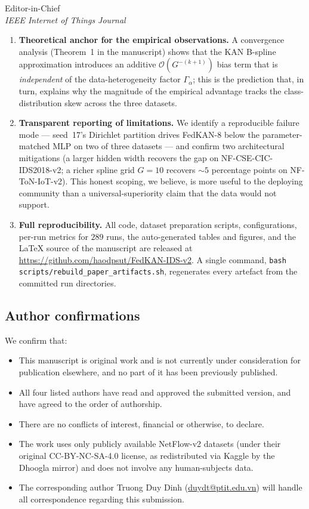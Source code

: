 \documentclass[11pt,a4paper]{letter}
\begin{document}
\begin{letter}{%
    Editor-in-Chief\\
    \emph{IEEE Internet of Things Journal}%
}
\begin{enumerate}
    \item \textbf{Theoretical anchor for the empirical observations.} A convergence analysis (Theorem~1 in the manuscript) shows that the KAN B-spline approximation introduces an additive $\mathcal{O}(G^{-(k+1)})$ bias term that is \emph{independent} of the data-heterogeneity factor $\Gamma_\alpha$; this is the prediction that, in turn, explains why the magnitude of the empirical advantage tracks the class-distribution skew across the three datasets.

    \item \textbf{Transparent reporting of limitations.} We identify a reproducible failure mode --- seed~17's Dirichlet partition drives FedKAN-8 below the parameter-matched MLP on two of three datasets --- and confirm two architectural mitigations (a larger hidden width recovers the gap on NF-CSE-CIC-IDS2018-v2; a richer spline grid $G=10$ recovers $\sim 5$ percentage points on NF-ToN-IoT-v2). This honest scoping, we believe, is more useful to the deploying community than a universal-superiority claim that the data would not support.

    \item \textbf{Full reproducibility.} All code, dataset preparation scripts, configurations, per-run metrics for $289$ runs, the auto-generated tables and figures, and the \LaTeX{} source of the manuscript are released at \url{https://github.com/haodpsut/FedKAN-IDS-v2}. A single command, \texttt{bash scripts/rebuild\_paper\_artifacts.sh}, regenerates every artefact from the committed run directories.
\end{enumerate}

\subsection*{Author confirmations}

We confirm that:
\begin{itemize}
    \item This manuscript is original work and is not currently under consideration for publication elsewhere, and no part of it has been previously published.
    \item All four listed authors have read and approved the submitted version, and have agreed to the order of authorship.
    \item There are no conflicts of interest, financial or otherwise, to declare.
    \item The work uses only publicly available NetFlow-v2 datasets (under their original CC-BY-NC-SA-4.0 license, as redistributed via Kaggle by the Dhoogla mirror) and does not involve any human-subjects data.
    \item The corresponding author Truong Duy Dinh (\href{mailto:duydt@ptit.edu.vn}{duydt@ptit.edu.vn}) will handle all correspondence regarding this submission.
\end{itemize}


\end{letter}
\end{document}
